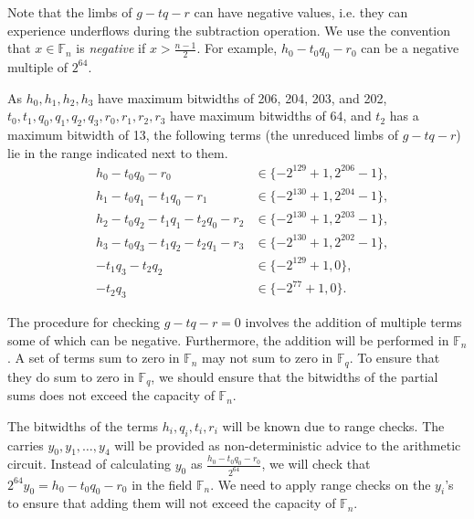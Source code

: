 \documentclass[a4paper, 12pt]{article}
\begin{document}
Note that the limbs of $g-tq-r$ can have negative values, i.e. they can experience underflows during the subtraction operation. We use the convention that $x \in \mathbb{F}_n$ is \textit{negative} if $x > \frac{n-1}{2}$.  For example, $h_0-t_0q_0-r_0$ can be a negative multiple of $2^{64}$.

As $h_0, h_1, h_2, h_3$ have maximum bitwidths of 206, 204, 203, and 202, $t_0, t_1, q_0, q_1, q_2, q_3, r_0, r_1, r_2, r_3$ have maximum bitwidths of 64, and $t_2$ has a maximum bitwidth of 13, the following terms (the unreduced limbs of $g-tq-r$) lie in the range indicated next to them.
\begin{align*}
  & h_0 - t_0q_0-r_0 & \in \{-2^{129}+1, 2^{206}-1 \},\\
  & h_1 - t_0q_1-t_1q_0-r_1 & \in \{-2^{130}+1, 2^{204}-1 \},\\
  & h_2 - t_0q_2-t_1q_1-t_2q_0-r_2 & \in \{-2^{130}+1, 2^{203}-1 \},\\
  & h_3 -  t_0q_3-t_1q_2-t_2q_1-r_3 & \in \{-2^{130}+1, 2^{202}-1 \},\\
  & - t_1q_3-t_2q_2 & \in \{-2^{129}+1, 0\},\\
  & - t_2q_3 & \in \{-2^{77}+1,0 \}.
\end{align*}

The procedure for checking $g-tq-r =0$ involves the addition of multiple terms some of which can be negative. Furthermore, the addition will be performed in $\mathbb{F}_n$. A set of terms sum to zero in $\mathbb{F}_n$ may not sum to zero in $\mathbb{F}_q$. To ensure that they do sum to zero in $\mathbb{F}_q$, we should ensure that the bitwidths of the partial sums does not exceed the capacity of $\mathbb{F}_n$.

The bitwidths of the terms $h_i, q_i, t_i, r_i$ will be known due to range checks. The carries $y_0,y_1,\ldots,y_4$ will be provided as non-deterministic advice to the arithmetic circuit. Instead of calculating $y_0$ as $\frac{h_0-t_0q_0-r_0}{2^{64}}$, we will check that $2^{64}y_0 = h_0-t_0q_0-r_0$ in the field $\mathbb{F}_n$. We need to apply range checks on the $y_i$'s to ensure that adding them will not exceed the capacity of $\mathbb{F}_n$.
\end{document}
